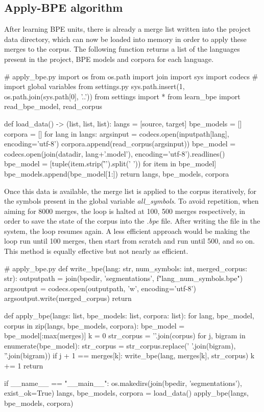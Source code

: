 \subsection{Apply-BPE algorithm}\label{dev:applybpe}

After learning BPE units, there is already a merge list written into the project data directory, which can now be loaded into memory in order to apply these merges to the corpus. The following function returns a list of the languages present in the project, BPE models and corpora for each language.

\begin{python}
# apply_bpe.py
import os
from os.path import join
import sys
import codecs
# import global variables from settings.py
sys.path.insert(1, os.path.join(sys.path[0], '..'))
from settings import *
from learn_bpe import read_bpe_model, read_corpus

def load_data() -> (list, list, list):
  langs = [source, target]
  bpe_models = []
  corpora = []
  for lang in langs:
    argsinput = codecs.open(inputpath[lang], encoding='utf-8')
    corpora.append(read_corpus(argsinput))
    bpe_model = codecs.open(join(datadir, lang+'.model'), encoding='utf-8').readlines()
    bpe_model = [tuple(item.strip('\r\n ').split(' ')) for item in bpe_model]
    bpe_models.append(bpe_model[1:])
  return langs, bpe_models, corpora
\end{python}

Once this data is available, the merge list is applied to the corpus iteratively, for the symbols present in the global variable \emph{all\_symbols}. To avoid repetition, when aiming for 8000 merges, the loop is halted at 100, 500 merges respectively, in order to save the state of the corpus into the \emph{.bpe} file. After writing the file in the system, the loop resumes again. A less efficient approach would be making the loop run until 100 merges, then start from scratch and run until 500, and so on. This method is equally effective but not nearly as efficient.

\begin{python}
# apply_bpe.py
def write_bpe(lang: str, num_symbols: int, merged_corpus: str):
  outputpath = join(bpedir, 'segmentations', f"{lang}_{num_symbols}.bpe")
  argsoutput = codecs.open(outputpath, 'w', encoding='utf-8')
  argsoutput.write(merged_corpus)
  return

def apply_bpe(langs: list, bpe_models: list, corpora: list):
  for lang, bpe_model, corpus in zip(langs, bpe_models, corpora):
    bpe_model = bpe_model[:max(merges)]
    k = 0
    str_corpus = '\n'.join(corpus)
    for j, bigram in enumerate(bpe_model):
      str_corpus = str_corpus.replace(' '.join(bigram), ''.join(bigram))
      if j + 1 == merges[k]:
        write_bpe(lang, merges[k], str_corpus)
        k += 1
  return

if __name__ == "__main__":
  os.makedirs(join(bpedir, 'segmentations'), exist_ok=True)
  langs, bpe_models, corpora = load_data()
  apply_bpe(langs, bpe_models, corpora)
\end{python}

